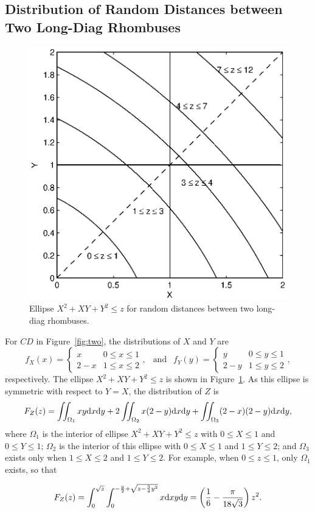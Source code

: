 \documentclass[12pt,draftclsnofoot,onecolumn]{IEEEtran}
\begin{document}
\subsection{Distribution of Random Distances between Two Long-Diag Rhombuses}

\begin{figure}
  \centering
  \includegraphics[width=0.5\columnwidth]{fig/rhombus_diag1}
  \caption{Ellipse $X^2+XY+Y^2 \leq z$ for random distances between two long-diag rhombuses.}
  \label{fig:diag1}
\end{figure}

For $CD$ in Figure~\ref{fig:two}, the distributions of $X$ and $Y$ are
\begin{equation}\label{eq:fxy_diag}
  f_X(x)=\left\{
    \begin{array}{lr}
      x & 0\leq x \leq 1 \\
      2-x & 1 \leq x \leq 2
    \end{array}
  \right.,
  ~~\mbox{ and }~~ f_Y(y)=\left\{
    \begin{array}{lr}
      y & 0\leq y \leq 1 \\
      2-y & 1 \leq y \leq 2
    \end{array}
  \right.,
\end{equation}
respectively.
The ellipse $X^2+XY+Y^2 \leq z$ is shown in Figure~\ref{fig:diag1}. As this
ellipse is symmetric with respect to $Y=X$, the distribution of $Z$ is
\begin{equation}\label{eq:fz_longdiag}
 F_Z(z)=\iint_{\Omega_1}xy{\rm d}x{\rm d}y+2\iint_{\Omega_2}x(2-y){\rm d}x{\rm
d}y+\iint_{\Omega_3}(2-x)(2-y){\rm d}x{\rm d}y,
\end{equation}
where $\Omega_1$ is the interior of ellipse $X^2+XY+Y^2 \leq z$ with $0 \leq X
\leq 1$ and $0 \leq Y \leq 1$; $\Omega_2$ is the interior of this ellipse with
$0 \leq X \leq 1$ and $1 \leq Y \leq 2$; and $\Omega_3$ exists only when $1 \leq X \leq 2$
and $1 \leq Y \leq 2$.
For example, when $0\leq z \leq 1$, only $\Omega_1$
exists, so that
\begin{small}
 \begin{equation}
 F_Z(z)=\int_0^{\sqrt{z}}\int_0^{-\frac{y}{2}+\sqrt{z-\frac{3}{4}y^2}}
x{\rm d}xy{\rm d}y=\left(\frac{1}{6}-\frac{\pi}{18\sqrt{3}}\right)z^2.
\end{equation}
\end{small}
\end{document}

